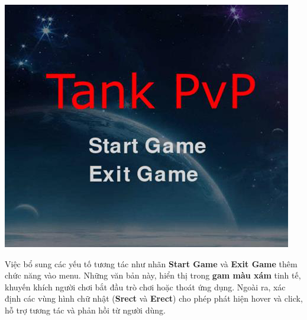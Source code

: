 \documentclass[a4paper]{article}
\begin{document}
\includegraphics[width=4.98889in,height=4.26111in]{image29.png}

Việc bổ sung các yếu tố tương tác như nhãn \textbf{Start Game} và \textbf{Exit Game} thêm
chức năng vào menu. Những văn bản này, hiển thị trong \textbf{gam màu
xám} tinh tế, khuyến khích người chơi bắt đầu trò chơi hoặc thoát ứng
dụng. Ngoài ra, xác định các vùng hình chữ nhật (\textbf{Srect} và \textbf{Erect}) cho phép phát hiện hover và click, hỗ trợ tương tác và phản hồi từ người dùng.
\end{document}
